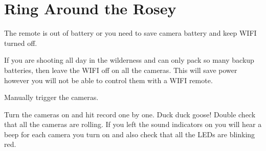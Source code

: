 \chapter{Ring Around the Rosey}
\pagecolor{white}
\label{chap:21}
\begin{fullwidth}


\problem

{\large The remote is out of battery or you need to save camera battery and keep WIFI turned off. 



 \par}

If you are shooting all day in the wilderness and can only pack so many backup batteries, then leave the WIFI off on all the cameras. This will save power however you will not be able to control them with a WIFI remote. 


\solution

{\large Manually trigger the cameras. 

 \par}

Turn the cameras on and hit record one by one. Duck duck goose! Double check that all the cameras are rolling. If you left the sound indicators on you will hear a beep for each camera you turn on and also check that all the LEDs are blinking red. 


\clearpage
\end{fullwidth}
